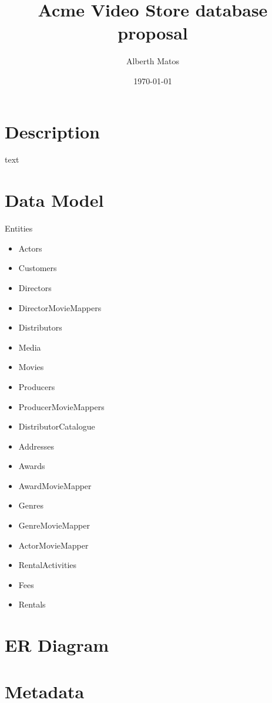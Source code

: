 \documentclass[letterpaper,12pt]{article}
\title{\large{Acme Video Store database proposal}}
\author{Alberth Matos}
\date{\today}
\begin{document}
\fancyhead{}

\maketitle

\section{Description}
text
\section{Data Model}
Entities
\begin{itemize}
\item Actors
\item Customers
\item Directors
\item DirectorMovieMappers
\item Distributors
\item Media
\item Movies
\item Producers
\item ProducerMovieMappers
\item DistributorCatalogue
\item Addresses
\item Awards
\item AwardMovieMapper
\item Genres
\item GenreMovieMapper
\item ActorMovieMapper
\item RentalActivities
\item Fees
\item Rentals

\end{itemize}
\section{ER Diagram}

\section{Metadata}
\end{document}
